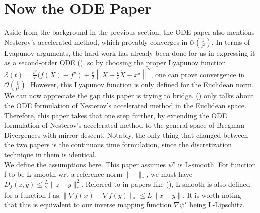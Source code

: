 \documentclass{article}
\begin{document}
\section{Now the ODE Paper}

Aside from the background in the previous section, the ODE paper also mentions Nesterov's accelerated method, which provably converges in $\mathcal{O}(\frac{1}{t^2})$. In terms of Lyapunov arguments, the hard work has already been done for us in expressing it as a second-order ODE (\cite{su2014differential}), so by choosing the proper Lyapunov function $\mathcal{E}(t)=\frac{t^{2}}{r}(f(X)-\left.f^{\star}\right)+\frac{r}{2}\left\|X+\frac{t}{r} \dot{X}-x^{\star}\right\|^{2}$, one can prove convergence in $\mathcal{O}(\frac{1}{t^2})$. However, this Lyapunov function is only defined for the Euclidean norm.\\

We can now appreciate the gap this paper is trying to bridge. (\cite{su2014differential}) only talks about the ODE formulation of Nesterov's accelerated method in the Euclidean space. Therefore, this paper takes that one step further, by extending the ODE formulation of Nesterov's accelerated method to the general space of Bregman Divergences with mirror descent. Notably, the only thing that changed between the two papers is the continuous time formulation, since the discretization technique in them is identical.\\




We define the assumptions here. This paper assumes $\psi^{\star}$ is L-smooth. For function f to be L-smooth wrt a reference norm $\|\cdot\|_{*}$, we must have $D_{f}(z, y) \leq \frac{L}{2}\|z-y\|_{*}^{2}$. Referred to in papers like (\cite{allen2014linear}), L-smooth is also defined for a function f as $\|\nabla f(x)-\nabla f(y)\|_{*} \leq L\|x-y\|$. It is worth noting that this is equivalent to our inverse mapping function $\nabla \psi^{\star}$ being L-Lipschitz.
\end{document}
